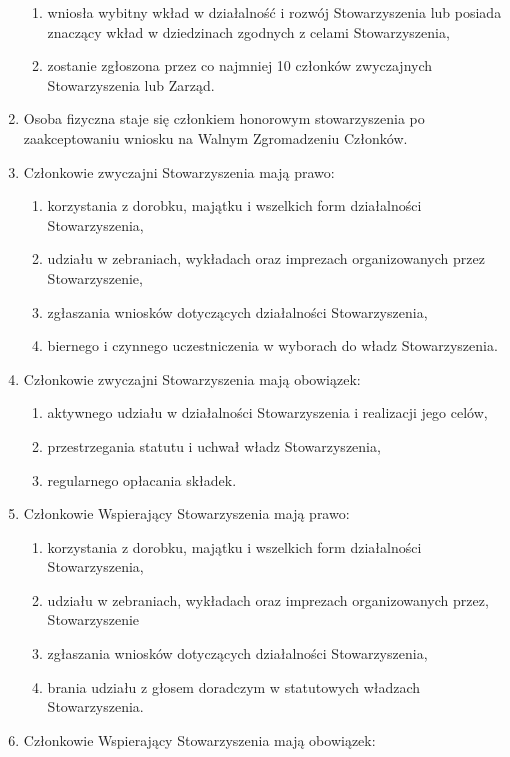 \documentclass{article}
\begin{document}
\begin{enumerate}
\begin{enumerate}
        \item wniosła wybitny wkład w działalność i rozwój Stowarzyszenia lub posiada znaczący wkład w dziedzinach zgodnych z celami Stowarzyszenia,
        \item zostanie zgłoszona przez co najmniej 10 członków zwyczajnych Stowarzyszenia lub Zarząd.
      \end{enumerate}
    \item Osoba fizyczna staje się członkiem honorowym stowarzyszenia po zaakceptowaniu wniosku na Walnym Zgromadzeniu Członków.
    \item Członkowie zwyczajni Stowarzyszenia mają prawo:
      \begin{enumerate}
        \item korzystania z dorobku, majątku i wszelkich form działalności Stowarzyszenia,
        \item udziału w zebraniach, wykładach oraz imprezach organizowanych przez Stowarzyszenie,
        \item zgłaszania wniosków dotyczących działalności Stowarzyszenia,
        \item biernego i czynnego uczestniczenia w wyborach do władz Stowarzyszenia.
      \end{enumerate}
    \item Członkowie zwyczajni Stowarzyszenia mają obowiązek:
      \begin{enumerate}
        \item aktywnego udziału w działalności Stowarzyszenia i realizacji jego celów,
        \item przestrzegania statutu i uchwał władz Stowarzyszenia,
        \item regularnego opłacania składek.
      \end{enumerate}
    \item Członkowie Wspierający Stowarzyszenia mają prawo:
      \begin{enumerate}
        \item korzystania z dorobku, majątku i wszelkich form działalności Stowarzyszenia,
        \item udziału w zebraniach, wykładach oraz imprezach organizowanych przez, Stowarzyszenie
        \item zgłaszania wniosków dotyczących działalności Stowarzyszenia,
        \item brania udziału z głosem doradczym w statutowych władzach Stowarzyszenia.
      \end{enumerate}
    \item Członkowie Wspierający Stowarzyszenia mają obowiązek:

\end{enumerate}
\end{document}

